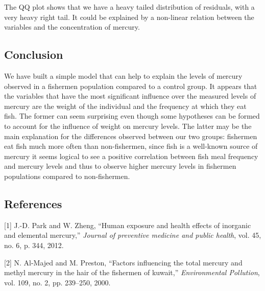 \documentclass[12pt,]{article}
\begin{document}
The QQ plot shows that we have a heavy tailed distribution of residuals,
with a very heavy right tail. It could be explained by a non-linear
relation between the variables and the concentration of mercury.

\subsection{Conclusion}\label{conclusion}

We have built a simple model that can help to explain the levels of
mercury observed in a fishermen population compared to a control group.
It appears that the variables that have the most significant influence
over the measured levels of mercury are the weight of the individual and
the frequency at which they eat fish. The former can seem surprising
even though some hypotheses can be formed to account for the influence
of weight on mercury levels. The latter may be the main explanation for
the differences observed between our two groups: fishermen eat fish much
more often than non-fishermen, since fish is a well-known source of
mercury it seems logical to see a positive correlation between fish meal
frequency and mercury levels and thus to observe higher mercury levels
in fishermen populations compared to non-fishermen.

\subsection*{References}\label{references}

\hypertarget{refs}{}
\hypertarget{ref-park2012human}{}
{[}1{]} J.-D. Park and W. Zheng, ``Human exposure and health effects of
inorganic and elemental mercury,'' \emph{Journal of preventive medicine
and public health}, vol. 45, no. 6, p. 344, 2012.

\hypertarget{ref-al2000factors}{}
{[}2{]} N. Al-Majed and M. Preston, ``Factors influencing the total
mercury and methyl mercury in the hair of the fishermen of kuwait,''
\emph{Environmental Pollution}, vol. 109, no. 2, pp. 239--250, 2000.
\end{document}
